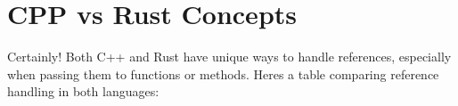 \chapter{CPP vs Rust Concepts}
\hypertarget{md_docs_2own__docs_2cpp__fudamentals_2cpp__vs__rust}{}\label{md_docs_2own__docs_2cpp__fudamentals_2cpp__vs__rust}
\label{md_docs_2own__docs_2cpp__fudamentals_2cpp__vs__rust_autotoc_md84}%
%

\begin{DoxyItemize}
\item Certainly! Both C++ and Rust have unique ways to handle references, especially when passing them to functions or methods. Here\textquotesingle{}s a table comparing reference handling in both languages\+:
\end{DoxyItemize}


